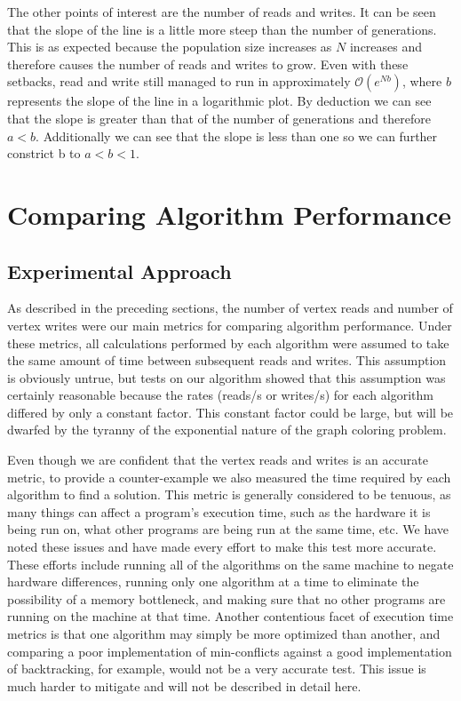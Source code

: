 \documentclass{article}
\begin{document}
	The other points of interest are the number of reads and writes. It can be seen that the slope of the line is a little more steep than the number of generations. This is as expected because the population size increases as $N$ increases and therefore causes the number of reads and writes to grow. Even with these setbacks, read and write still managed to run in approximately  $\mathcal{O} (e^{Nb})$, where $b$ represents the slope of the line in a logarithmic plot. By deduction we can see that the slope is greater than that of the number of generations and therefore $a<b$. Additionally we can see that the slope is less than one so we can further constrict b to $a<b<1$. 
\section{Comparing Algorithm Performance}
	\label{comparisons}
	
	\subsection{Experimental Approach}
	
	As described in the preceding sections, the number of vertex reads and number of vertex writes were our main metrics for comparing algorithm performance. Under these metrics, all calculations performed by each algorithm were assumed to take the same amount of time between subsequent reads and writes. This assumption is obviously untrue, but tests on our algorithm showed that this assumption was certainly reasonable because the rates (reads/s or writes/s) for each algorithm differed by only a constant factor. This constant factor could be large, but will be dwarfed by the tyranny of the exponential nature of the graph coloring problem.
	
	Even though we are confident that the vertex reads and writes is an accurate metric, to provide a counter-example we also measured the time required by each algorithm to find a solution. This metric is generally considered to be tenuous, as many things can affect a program's execution time, such as the hardware it is being run on, what other programs are being run at the same time, etc. We have noted these issues and have made every effort to make this test more accurate. These efforts include running all of the algorithms on the same machine to negate hardware differences, running only one algorithm at a time to eliminate the possibility of a memory bottleneck, and making sure that no other programs are running on the machine at that time. Another contentious facet of execution time metrics is that one algorithm may simply be more optimized than another, and comparing a poor implementation of min-conflicts against a good implementation of backtracking, for example, would not be a very accurate test. This issue is much harder to mitigate and will not be described in detail here.
\end{document}
